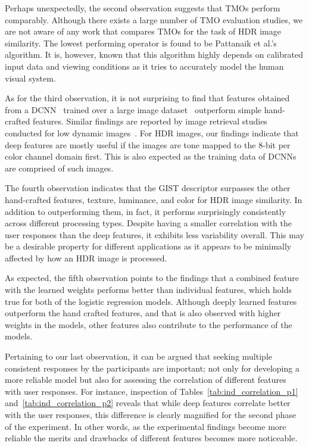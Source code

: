 Perhaps unexpectedly, the second observation suggests that TMOs perform comparably. Although there exists a large number of TMO evaluation studies, we are not aware of any work that compares TMOs for the task of HDR image similarity. The lowest performing operator is found to be Pattanaik et al.'s~\cite{pattanaik2000time} algorithm. It is, however, known that this algorithm highly depends on calibrated input data and viewing conditions as it tries to accurately model the human visual system.

As for the third observation, it is not surprising to find that features obtained from a DCNN~\cite{simonyan2014very} trained over a large image dataset~\cite{russakovsky2015imagenet} outperform simple hand-crafted features. Similar findings are reported by image retrieval studies conducted for low dynamic images~\cite{wan2014deep,gordo2016deep}. For HDR images, our findings indicate that deep features are mostly useful if the images are tone mapped to the 8-bit per color channel domain first. This is also expected as the training data of DCNNs are comprised of such images.

The fourth observation indicates that the GIST descriptor surpasses the other hand-crafted features, texture, luminance, and color for HDR image similarity. In addition to outperforming them, in fact, it performs surprisingly consistently across different processing types. Despite having a smaller correlation with the user responses than the deep features, it exhibits less variability overall. This may be a desirable property for different applications as it appears to be minimally affected by how an HDR image is processed.

As expected, the fifth observation points to the findings that a combined feature with the learned weights performs better than individual features, which holds true for both of the logistic regression models. Although deeply learned features outperform the hand crafted features, and that is also observed with higher weights in the models, other features also contribute to the performance of the models. 

Pertaining to our last observation, it can be argued that seeking multiple consistent responses by the participants are important; not only for developing a more reliable model but also for assessing the correlation of different features with user responses. For instance, inspection of Tables~\ref{tab:ind_correlation_p1} and~\ref{tab:ind_correlation_p2} reveals that while deep features correlate better with the user responses, this difference is clearly magnified for the second phase of the experiment. In other words, as the experimental findings become more reliable the merits and drawbacks of different features becomes more noticeable.